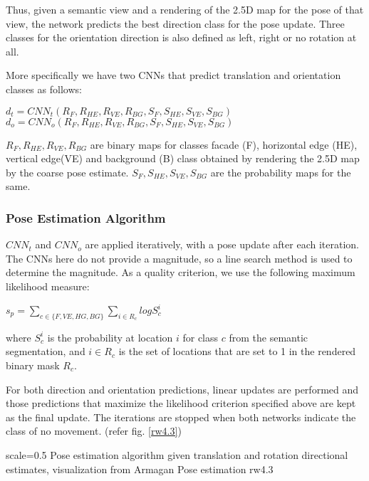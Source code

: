 Thus, given a semantic view and a rendering of the 2.5D map for the pose of that view, the network predicts the best direction class for the pose update. Three classes for the orientation direction is also defined as left, right or no rotation at all. 

More specifically we have two CNNs that predict translation and orientation classes as follows:

$d_t = CNN_t(R_F, R_{HE}, R_{VE}, R_{BG},S_F, S_{HE}, S_{VE}, S_{BG})$\\
$d_o = CNN_o(R_F, R_{HE}, R_{VE}, R_{BG},S_F, S_{HE}, S_{VE}, S_{BG})$

$R_F, R_{HE}, R_{VE}, R_{BG}$ are binary maps for classes facade (F), horizontal edge (HE), vertical edge(VE) and background (B) class obtained by rendering the 2.5D map by the coarse pose estimate. $S_F, S_{HE}, S_{VE}, S_{BG}$ are the probability maps for the same.

\subsubsection{Pose Estimation Algorithm}
$CNN_t$ and $CNN_o$ are applied iteratively, with a pose update after each iteration. The CNNs here do not provide a magnitude, so a line search method is used to determine the magnitude. As a quality criterion, we use the following maximum likelihood measure:

$s_p = \sum_{c \in \{F, VE, HG, BG\}}\sum_{i \in R_c} log S_c^i$

where $S^i_c$ is the probability at location $i$ for class $c$ from the semantic segmentation, and ${i\in R_c}$ is the set of locations that are set to 1 in the rendered binary mask $R_c$.

For both direction and orientation predictions, linear updates are performed and those predictions that maximize the likelihood criterion specified above are kept as the final update. The iterations are stopped when both networks indicate the class of no movement. (refer fig. \ref{rw4.3})

{scale=0.5}%
{Pose estimation algorithm given translation and rotation directional estimates, visualization from \cite{Armagan2017}}%
{Armagan Pose estimation}%
{rw4.3} %



 





